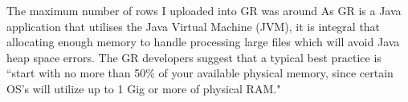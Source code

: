The maximum number of rows I uploaded into GR was around  As GR is a Java application that utilises the Java Virtual Machine (JVM), it is integral that allocating enough memory to handle processing large files which will avoid Java heap space errors. The GR developers suggest that a typical best practice is ``start with no more than 50\% of your available physical memory, since certain OS's will utilize up to 1 Gig or more of physical RAM." \cite{googref}